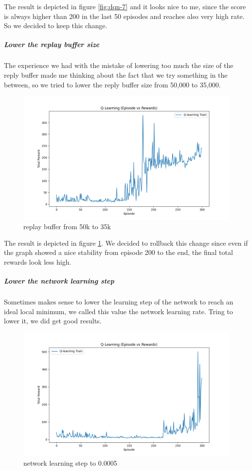 \documentclass{article}
\begin{document}
The result is depicted in figure \ref{fig:dqn-7} and it looks nice to me,
since the score is always higher than 200 in the last 50 episodes and reaches also very high rate.
So we decided to keep this change.

\subparagraph{Lower the replay buffer size}

The experience we had with the mistake of lowering too much the size of the reply buffer
made me thinking about the fact that we try something in the between,
so we tried to lower the reply buffer size from 50,000 to 35,000.

\begin{figure}
  \includegraphics[width=\linewidth]{DQN-0008.png}
  \caption{replay buffer from 50k to 35k}
  \label{fig:dqn-8}
\end{figure}

The result is depicted in figure \ref*{fig:dqn-8}.
We decided to rollback this change since even if the graph showed a nice stability from episode
200 to the end, the final total rewards look less high.

\subparagraph{Lower the network learning step}

Sometimes makes sense to lower the learning step of the network to reach an ideal local minimum,
we called this value the network learning rate.
Tring to lower it, we did get good results.

\begin{figure}
  \includegraphics[width=\linewidth]{DQN-0009.png}
  \caption{network learning step to 0.0005}
  \label{fig:dqn-9}
\end{figure}
\end{document}

